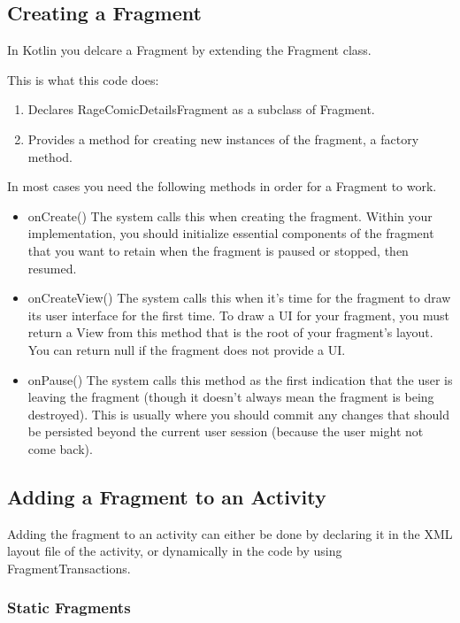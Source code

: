 \subsection{Creating a Fragment}
In Kotlin you delcare a Fragment by extending the Fragment class. 


This is what this code does:
\begin{enumerate}
	\item Declares RageComicDetailsFragment as a subclass of Fragment.
	\item Provides a method for creating new instances of the fragment, a factory method.
\end{enumerate}

In most cases you need the following methods in order for a Fragment to work.

\begin{itemize}
	\item onCreate()
	The system calls this when creating the fragment. Within your implementation, you should initialize essential components of the fragment that you want to retain when the fragment is paused or stopped, then resumed.
	\item onCreateView()
	The system calls this when it's time for the fragment to draw its user interface for the first time. To draw a UI for your fragment, you must return a View from this method that is the root of your fragment's layout. You can return null if the fragment does not provide a UI.
	\item onPause()
	The system calls this method as the first indication that the user is leaving the fragment (though it doesn't always mean the fragment is being destroyed). This is usually where you should commit any changes that should be persisted beyond the current user session (because the user might not come back).
\end{itemize}

\subsection{Adding a Fragment to an Activity}

Adding the fragment to an activity can either be done by declaring it in the XML layout file of the activity, or dynamically in the code by using FragmentTransactions.
\subsubsection{Static Fragments}

